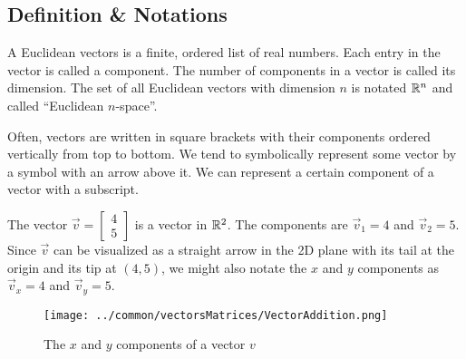 \subsection{Definition \& Notations}
\begin{definition}
	A Euclidean vectors is a finite, ordered list of real numbers.
	Each entry in the vector is called a component.
	The number of components in a vector is called its dimension.
	The set of all Euclidean vectors with dimension $n$ is notated $\mathbb{R}^n$ and called ``Euclidean $n$-space''.
\end{definition}

Often, vectors are written in square brackets with their components ordered vertically from top to bottom.
We tend to symbolically represent some vector by a symbol with an arrow above it.
We can represent a certain component of a vector with a subscript.

\begin{example}
	The vector $\vec{v} = \begin{bmatrix}4 \\ 5\end{bmatrix}$ is a vector in $\mathbb{R}^2$.
	The components are $\vec{v}_1 = 4$ and $\vec{v}_2 = 5$.
	Since $\vec{v}$ can be visualized as a straight arrow in the 2D plane with its tail at the origin and its tip at $(4,5)$, we might also notate the $x$ and $y$ components as $\vec{v}_x = 4$ and $\vec{v}_y = 5$.
	
	\begin{figure}[H]
		\centering
		\texttt{[image: ../common/vectorsMatrices/VectorAddition.png]}
		\caption{The $x$ and $y$ components of a vector $v$}
	\end{figure}
\end{example}